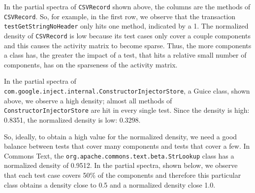 In the partial spectra of \texttt{CSVRecord} shown above, the columns are the methods of \texttt{CSVRecord}.
So, for example, in the first row, we observe that the transaction \texttt{testGetStringNoHeader} only hits one method, indicated by a 1.
The normalized density of \texttt{CSVRecord} is low because its test cases only cover a couple components and this causes the activity matrix to become sparse.
Thus, the more components a class has, the greater the impact of a test, that hits a relative small number of components, has on the sparseness of the activity matrix.

\begin{table}[]
\scriptsize
\centering
\caption{Partial activity matrix of the \texttt{ConstructorInjectorStore} class.}
\label{my-label}
\noindent{}
\end{table}

In the partial spectra of \texttt{com.google.inject.internal.Constructor\-Injector\-Store}, a Guice class, shown above, we observe a high density; almost all methods of \texttt{Constructor\-Injector\-Store} are hit in every single test.
Since the density is high: 0.8351, the normalized density is low: 0.3298.

So, ideally, to obtain a high value for the normalized density, we need a good balance between tests that cover many components and tests that cover a few.
In Commons Text, the \texttt{org.apache.commons.text.beta.StrLookup} class has a normalized density of 0.9512.
In the partial spectra, shown below, we observe that each test case covers 50\% of the components and therefore this particular class obtains a density close to 0.5 and a normalized density close 1.0.

